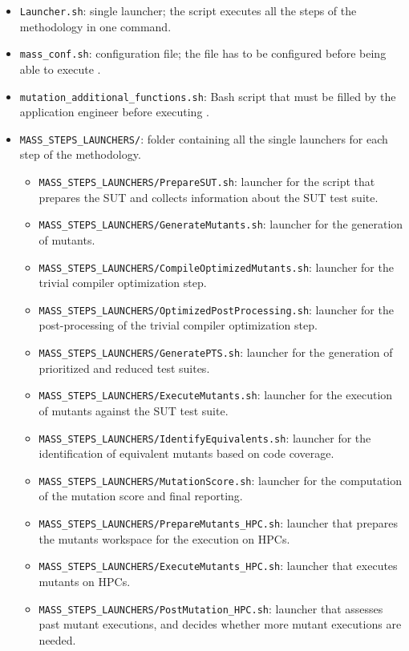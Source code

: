 \begin{itemize}
	\item \texttt{Launcher.sh}: \MASS single launcher; the script executes all the steps of the methodology in one command. 
	\item \texttt{mass\_conf.sh}: \MASS configuration file; the file has to be configured before being able to execute \MASS.
	\item \texttt{mutation\_additional\_functions.sh}: Bash script that must be filled by the application engineer before executing \MASS.
	\item \texttt{MASS\_STEPS\_LAUNCHERS/}: folder containing all the single launchers for each step of the \MASS methodology.
	\begin{itemize}
		\item \texttt{MASS\_STEPS\_LAUNCHERS/PrepareSUT.sh}: launcher for the script that prepares the SUT and collects information about the SUT test suite.
		\item \texttt{MASS\_STEPS\_LAUNCHERS/GenerateMutants.sh}: launcher for the generation of mutants.
		\item \texttt{MASS\_STEPS\_LAUNCHERS/CompileOptimizedMutants.sh}: launcher for the trivial compiler optimization step.
		\item \texttt{MASS\_STEPS\_LAUNCHERS/OptimizedPostProcessing.sh}: launcher for the post-processing of the trivial compiler optimization step.
		\item \texttt{MASS\_STEPS\_LAUNCHERS/GeneratePTS.sh}: launcher for the generation of prioritized and reduced test suites.
		\item \texttt{MASS\_STEPS\_LAUNCHERS/ExecuteMutants.sh}: launcher for the execution of mutants against the SUT test suite.
		\item \texttt{MASS\_STEPS\_LAUNCHERS/IdentifyEquivalents.sh}: launcher for the identification of equivalent mutants based on code coverage.
		\item \texttt{MASS\_STEPS\_LAUNCHERS/MutationScore.sh}: launcher for the computation of the mutation score and final reporting.
		\item \texttt{MASS\_STEPS\_LAUNCHERS/PrepareMutants\_HPC.sh}: launcher that prepares the mutants workspace for the execution on HPCs.
		\item \texttt{MASS\_STEPS\_LAUNCHERS/ExecuteMutants\_HPC.sh}: launcher that executes mutants on HPCs.
		\item \texttt{MASS\_STEPS\_LAUNCHERS/PostMutation\_HPC.sh}: launcher that assesses past mutant executions, and decides whether more mutant executions are needed.
	\end{itemize}

\end{itemize}

